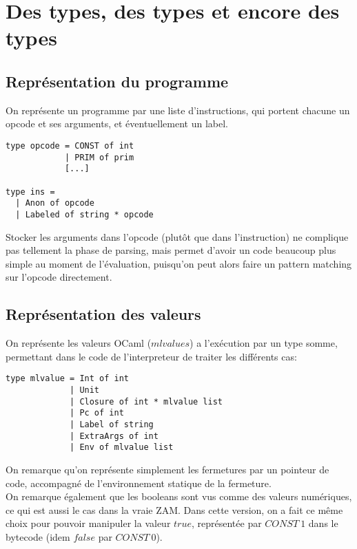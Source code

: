 \documentclass{article}
\begin{document}
\section{Des types, des types et encore des types}

\subsection{Représentation du programme}

On représente un programme par une liste d'instructions, qui portent chacune un opcode et ses arguments, et éventuellement un label.

\begin{lstlisting}
type opcode = CONST of int
            | PRIM of prim
            [...]

type ins =
  | Anon of opcode
  | Labeled of string * opcode
\end{lstlisting}

Stocker les arguments dans l'opcode (plutôt que dans l'instruction) ne complique pas tellement la phase de parsing, mais permet d'avoir un code beaucoup plus simple au moment de l'évaluation, puisqu'on peut alors faire un pattern matching sur l'opcode directement.

\subsection{Représentation des valeurs}

On représente les valeurs OCaml ($mlvalues$) a l'exécution par un type somme, permettant dans le code de l'interpreteur de traiter les différents cas:
\begin{lstlisting}
type mlvalue = Int of int
             | Unit
             | Closure of int * mlvalue list
             | Pc of int
             | Label of string
             | ExtraArgs of int
             | Env of mlvalue list
\end{lstlisting}
On remarque qu'on représente simplement les fermetures par un pointeur de code, accompagné de l'environnement statique de la fermeture.\\
On remarque également que les booleans sont vus comme des valeurs numériques, ce qui est aussi le cas dans la vraie ZAM. Dans cette version, on a fait ce même choix pour pouvoir manipuler la valeur $true$, représentée par $CONST\:1$ dans le bytecode (idem $false$ par $CONST\:0$).\\
\end{document}
